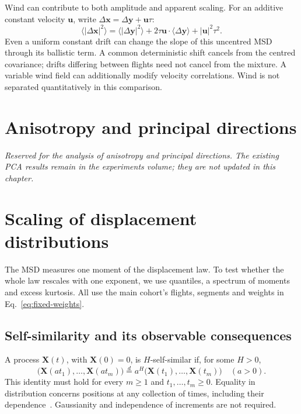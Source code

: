 Wind can contribute to both amplitude and apparent scaling. For an additive constant
velocity $\boldsymbol u$, write $\Delta\boldsymbol x=\Delta\boldsymbol y+\boldsymbol u\tau$:
\begin{equation}
 \langle|\Delta\boldsymbol x|^2\rangle
 =\langle|\Delta\boldsymbol y|^2\rangle
 +2\tau\boldsymbol u\cdot\langle\Delta\boldsymbol y\rangle+|\boldsymbol u|^2\tau^2.
 \label{eq:fixed-wind}
\end{equation}
Even a uniform constant drift can change the slope of this uncentred MSD through its
ballistic term. A common deterministic shift cancels from the centred covariance;
drifts differing between flights need not cancel from the mixture. A variable wind
field can additionally modify velocity correlations. Wind is not separated quantitatively
in this comparison.
\FloatBarrier

\section{Anisotropy and principal directions}
\label{sec:fixed-anisotropy}
\emph{Reserved for the analysis of anisotropy and principal directions. The existing
PCA results remain in the experiments volume; they are not updated in this chapter.}

\section{Scaling of displacement distributions}
\label{sec:fixed-scaling}

The MSD measures one moment of the displacement law. To test whether the whole law
rescales with one exponent, we use quantiles, a spectrum of moments and excess kurtosis.
All use the main cohort's flights, segments and weights in Eq.~\eqref{eq:fixed-weights}.

\subsection{Self-similarity and its observable consequences}
\label{sec:fixed-selfsimilar-definition}

A process $\boldsymbol X(t)$, with $\boldsymbol X(0)=0$, is $H$-self-similar if,
for some $H>0$,
\begin{equation}
 \bigl(\boldsymbol X(at_1),\ldots,\boldsymbol X(at_m)\bigr)
 \overset d= a^H\bigl(\boldsymbol X(t_1),\ldots,\boldsymbol X(t_m)\bigr)
 \quad(a>0).
 \label{eq:fixed-selfsimilar}
\end{equation}
This identity must hold for every $m\geq1$ and $t_1,\ldots,t_m\geq0$.
Equality in distribution concerns positions at any collection of times, including
their dependence~\cite{embrechts_maejima_selfsimilar}. Gaussianity and independence
of increments are not required.

